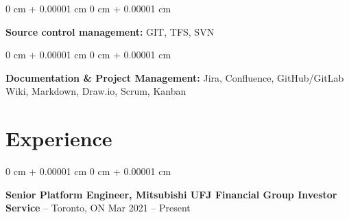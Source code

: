 \documentclass[11pt, letterpaper]{article}
\newenvironment{onecolentry}{
\begin{adjustwidth}{
0 cm + 0.00001 cm
}{
0 cm + 0.00001 cm
}
}{
\end{adjustwidth}
} %
\newenvironment{twocolentry}[2][]{
\onecolentry
\def\secondColumn{#2}
\setcolumnwidth{\fill, 4.5 cm}
\begin{paracol}{2}
}{
\switchcolumn \raggedleft \secondColumn
\end{paracol}
\endonecolentry
} %
\begin{document}
\vspace{0.05 cm}

\begin{onecolentry}
\textbf{Source control management:} GIT, TFS, SVN


\end{onecolentry}
\vspace{0.05 cm}

\begin{onecolentry}
\textbf{Documentation \& Project Management:} Jira, Confluence, GitHub/GitLab Wiki, Markdown, Draw.io, Scrum, Kanban


\end{onecolentry}







\section{Experience}

\begin{twocolentry}{
Mar 2021 – Present
}
\textbf{Senior Platform Engineer, Mitsubishi UFJ Financial Group Investor Service}  -- Toronto, ON\end{twocolentry}
\end{document}
